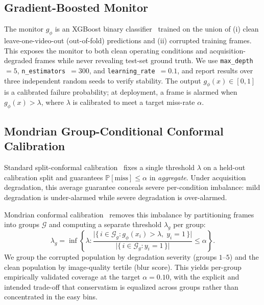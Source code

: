 \documentclass[letterpaper, 10 pt, conference]{ieeeconf}  %
\begin{document}
\subsection{Gradient-Boosted Monitor}

The monitor $g_\phi$ is an XGBoost binary classifier~\cite{ref:xgboost}
trained on the union of (i) clean leave-one-video-out (out-of-fold)
predictions and (ii) corrupted training frames. This exposes the monitor to
both clean operating conditions and acquisition-degraded frames while never
revealing test-set ground truth. We use \texttt{max\_depth}~$=5$,
\texttt{n\_estimators}~$=300$, and \texttt{learning\_rate}~$=0.1$, and report
results over three independent random seeds to verify stability. The output
$g_\phi(x) \in [0,1]$ is a calibrated failure probability; at deployment, a
frame is alarmed when $g_\phi(x) > \lambda$, where $\lambda$ is calibrated to
meet a target miss-rate $\alpha$.

\subsection{Mondrian Group-Conditional Conformal Calibration}

Standard split-conformal calibration~\cite{ref:vovk} fixes a single threshold
$\lambda$ on a held-out calibration split and guarantees
$\mathbb{P}[\mathrm{miss}] \le \alpha$ in \emph{aggregate}. Under acquisition
degradation, this average guarantee conceals severe per-condition imbalance:
mild degradation is under-alarmed while severe degradation is over-alarmed.

Mondrian conformal calibration~\cite{ref:mondrian} removes this imbalance by
partitioning frames into groups $\mathcal{G}$ and computing a separate
threshold $\lambda_g$ per group:
\begin{equation}
\lambda_g = \inf\!\left\{ \lambda :
\frac{\bigl|\{\, i \in \mathcal{G}_g : g_\phi(x_i) > \lambda,\; y_i = 1 \,\}\bigr|}
     {\bigl|\{\, i \in \mathcal{G}_g : y_i = 1 \,\}\bigr|} \le \alpha \right\}.
\end{equation}
We group the corrupted population by degradation severity (groups
$1$--$5$) and the clean population by image-quality tertile (blur score).
This yields per-group empirically validated coverage at the target
$\alpha = 0.10$, with the explicit and intended trade-off that conservatism
is equalized across groups rather than concentrated in the easy bins.

\end{document}
